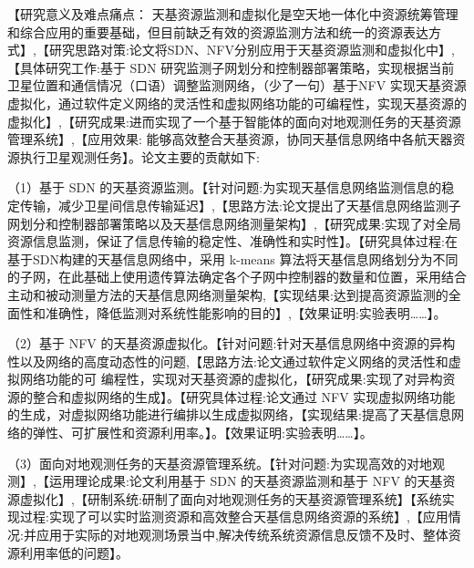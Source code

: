 
\begin{abstractcn}\setlength{\baselineskip}{20pt}%
    【研究意义及难点痛点： 天基资源监测和虚拟化是空天地一体化中资源统筹管理和综合应用的重要基础，但目前缺乏有效的资源监测方法和统一的资源表达方式】,【研究思路对策:论文将SDN、NFV分别应用于天基资源监测和虚拟化中】,【具体研究工作:基于 SDN 研究监测子网划分和控制器部署策略，实现根据当前卫星位置和通信情况（口语）调整监测网络，（少了一句）基于NFV 实现天基资源虚拟化，通过软件定义网络的灵活性和虚拟网络功能的可编程性，实现天基资源的虚拟化】,【研究成果:进而实现了一个基于智能体的面向对地观测任务的天基资源管理系统】,【应用效果:  能够高效整合天基资源，协同天基信息网络中各航天器资源执行卫星观测任务】。论文主要的贡献如下:

    （1）基于 SDN 的天基资源监测。【针对问题:为实现天基信息网络监测信息的稳定传输，减少卫星间信息传输延迟】,【思路方法:论文提出了天基信息网络监测子网划分和控制器部署策略以及天基信息网络测量架构】,【研究成果:实现了对全局资源信息监测，保证了信息传输的稳定性、准确性和实时性】。【研究具体过程:在基于SDN构建的天基信息网络中，采用 k-means 算法将天基信息网络划分为不同的子网，在此基础上使用遗传算法确定各个子网中控制器的数量和位置，采用结合主动和被动测量方法的天基信息网络测量架构,【实现结果:达到提高资源监测的全面性和准确性，降低监测对系统性能影响的目的】,【效果证明:实验表明……】。

    （2）基于 NFV 的天基资源虚拟化。【针对问题:针对天基信息网络中资源的异构性以及网络的高度动态性的问题,【思路方法:论文通过软件定义网络的灵活性和虚拟网络功能的可 编程性，实现对天基资源的虚拟化，【研究成果:实现了对异构资源的整合和虚拟网络的生成】。【研究具体过程:论文通过 NFV 实现虚拟网络功能的生成，对虚拟网络功能进行编排以生成虚拟网络，【实现结果:提高了天基信息网络的弹性、可扩展性和资源利用率。】。【效果证明:实验表明……】。

    （3）面向对地观测任务的天基资源管理系统。【针对问题:为实现高效的对地观测】,【运用理论成果:论文利用基于 SDN 的天基资源监测和基于 NFV 的天基资源虚拟化】,【研制系统:研制了面向对地观测任务的天基资源管理系统】【系统实现过程:实现了可以实时监测资源和高效整合天基信息网络资源的系统】,【应用情况:并应用于实际的对地观测场景当中,解决传统系统资源信息反馈不及时、整体资源利用率低的问题】。
\end{abstractcn}